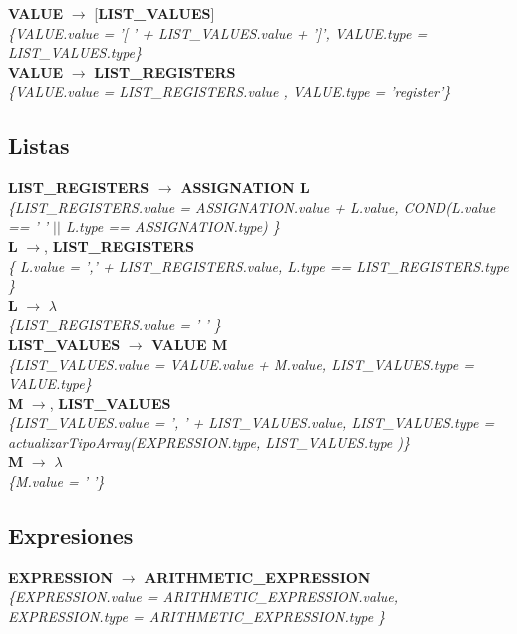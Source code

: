 \documentclass[10pt,a4paper]{article}
\begin{document}
\textbf{VALUE} $\rightarrow$ [\textbf{LIST\_VALUES}]   \\
\textit{\{VALUE.value =  '[ ' + LIST\_VALUES.value + ']', VALUE.type = LIST\_VALUES.type\}} \\

\textbf{VALUE} $\rightarrow$ \textbf{LIST\_REGISTERS} \\
\textit{\{VALUE.value =  LIST\_REGISTERS.value , VALUE.type = 'register'\}} \\

\subsection{Listas}
\textbf{LIST\_REGISTERS} $\rightarrow$ \textbf{ASSIGNATION L} \\
\textit{\{LIST\_REGISTERS.value =  ASSIGNATION.value + L.value, COND(L.value == ' ' $||$ L.type == ASSIGNATION.type) \}} \\

\textbf{L} $\rightarrow$, \textbf{LIST\_REGISTERS} \\
\textit{\{ L.value = ',' + LIST\_REGISTERS.value, L.type == LIST\_REGISTERS.type  \}} \\

\textbf{L} $\rightarrow$ $\lambda$\\
\textit{\{LIST\_REGISTERS.value =  ' ' \}}  \\ 

\textbf{LIST\_VALUES} $\rightarrow$ \textbf{VALUE M} \\
\textit{\{LIST\_VALUES.value =  VALUE.value + M.value, LIST\_VALUES.type = VALUE.type\}} \\

\textbf{M} $\rightarrow$, \textbf{LIST\_VALUES} \\
\textit{\{LIST\_VALUES.value = ', ' + LIST\_VALUES.value, LIST\_VALUES.type = actualizarTipoArray(EXPRESSION.type, LIST\_VALUES.type )\}} \\

\textbf{M} $\rightarrow$ $\lambda$ \\
\textit{\{M.value = ' '\}} \\

\subsection{Expresiones}
\textbf{EXPRESSION} $\rightarrow$ \textbf{ARITHMETIC\_EXPRESSION} \\   
\textit{\{EXPRESSION.value =  ARITHMETIC\_EXPRESSION.value, EXPRESSION.type = ARITHMETIC\_EXPRESSION.type \}}  \\
\end{document}
